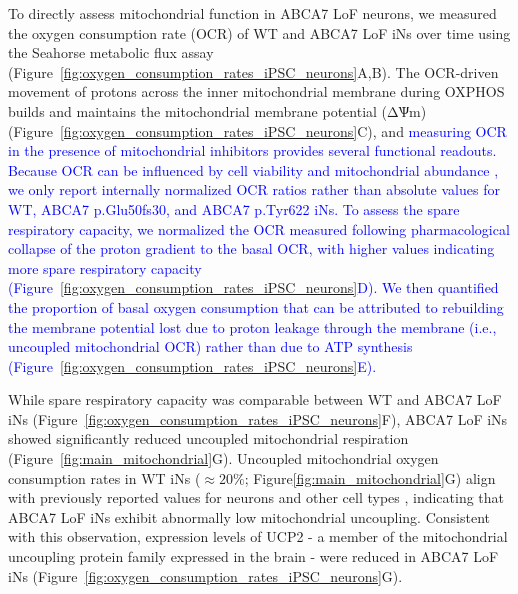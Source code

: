 To directly assess mitochondrial function in ABCA7 LoF neurons, we measured the oxygen consumption rate (OCR) of WT and ABCA7 LoF iNs over time using the Seahorse metabolic flux assay (Figure~\ref{fig:oxygen_consumption_rates_iPSC_neurons}A,B). The OCR-driven movement of protons across the inner mitochondrial membrane during OXPHOS builds and maintains the mitochondrial membrane potential (ΔѰm)(Figure~\ref{fig:oxygen_consumption_rates_iPSC_neurons}C), and  \newcommand{\quoteC}{\textcolor{blue}{measuring OCR in the presence of mitochondrial inhibitors provides several functional readouts. Because OCR can be influenced by cell viability and mitochondrial abundance \cite{Divakaruni2014-eq,Gu2021-ms}, we only report internally normalized OCR ratios rather than absolute values \cite{Divakaruni2022-bp} for WT, ABCA7 p.Glu50fs30, and ABCA7 p.Tyr622 iNs. To assess the spare respiratory capacity, we normalized the OCR measured following pharmacological collapse of the proton gradient to the basal OCR, with higher values indicating more spare respiratory capacity \cite{Divakaruni2022-bp} (Figure~\ref{fig:oxygen_consumption_rates_iPSC_neurons}D). We then quantified the proportion of basal oxygen consumption that can be attributed to rebuilding the membrane potential lost due to proton leakage through the membrane (i.e., uncoupled mitochondrial OCR) rather than due to ATP synthesis \cite{Divakaruni2022-bp} (Figure~\ref{fig:oxygen_consumption_rates_iPSC_neurons}E).\label{quoteC-label}}}
\quoteC

While spare respiratory capacity was comparable between WT and ABCA7 LoF iNs (Figure~\ref{fig:oxygen_consumption_rates_iPSC_neurons}F), ABCA7 LoF iNs showed significantly reduced uncoupled mitochondrial respiration (Figure~\ref{fig:main_mitochondrial}G). Uncoupled mitochondrial oxygen consumption rates in WT iNs ($\approx 20\%$; Figure\ref{fig:main_mitochondrial}G) align with previously reported values for neurons and other cell types \cite{Divakaruni2011-uj,Jekabsons2004-fn,Jain2024-br}, indicating that ABCA7 LoF iNs exhibit abnormally low mitochondrial uncoupling. Consistent with this observation, expression levels of UCP2 - a member of the mitochondrial uncoupling protein family expressed in the brain \cite{Kumar2022-bb} - were reduced in ABCA7 LoF iNs (Figure~\ref{fig:oxygen_consumption_rates_iPSC_neurons}G). 

